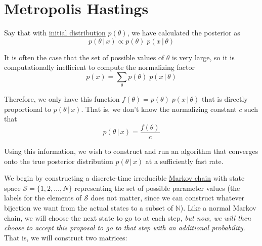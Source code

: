 \section{Metropolis Hastings} 

  Say that with \hyperref[sp-def:initial-distribution]{initial distribution} $p(\theta)$, we have calculated the posterior as
  \begin{equation}
    p(\theta\,|\,x) \propto p(\theta) \; p(x\,|\,\theta)
  \end{equation}

  It is often the case that the set of possible values of $\theta$ is very large, so it is computationally inefficient to compute the normalizing factor
  \begin{equation}
    p(x) = \sum_\theta p(\theta) \; p(x\,|\,\theta)
  \end{equation}

  Therefore, we only have this function $f(\theta) = p(\theta) \; p(x\,|\,\theta)$ that is directly proportional to $p(\theta\,|\,x)$. That is, we don't know the normalizing constant $c$ such that
  \begin{equation}
    p(\theta\,|\,x) = \frac{f(\theta)}{c}
  \end{equation}

  Using this information, we wish to construct and run an algorithm that converges onto the true posterior distribution $p(\theta\,|\,x)$ at a sufficiently fast rate.

  We begin by constructing a discrete-time irreducible \hyperref[sp-def:markov-chain]{Markov chain} with state space $\mathcal{S} = \{1, 2, \ldots, N\}$ representing the set of possible parameter values (the labels for the elements of $\mathcal{S}$ does not matter, since we can construct whatever bijection we want from the actual states to a subset of $\mathbb{N}$). Like a normal Markov chain, we will choose the next state to go to at each step, \textit{but now, we will then choose to accept this proposal to go to that step with an additional probability}. That is, we will construct two matrices:

